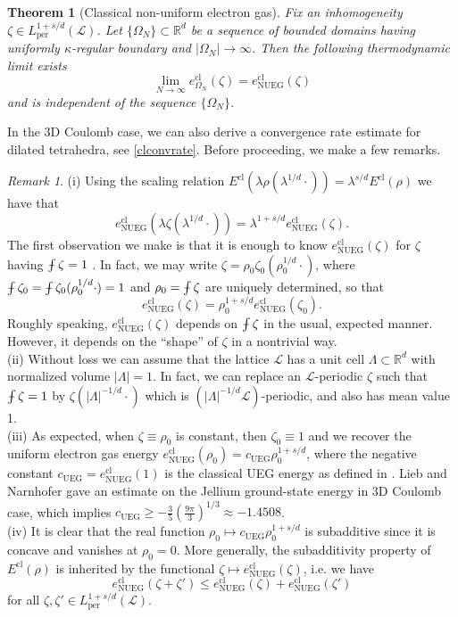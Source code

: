 \documentclass[final,onefignum,onetabnum,reqno]{amsart}
\newtheorem{theorem}{Theorem}[section]
\theoremstyle{remark}
\newtheorem{remark}{Remark}
\renewcommand{\le}{\leqslant}
\renewcommand{\ge}{\geqslant}
\newcommand{\RR}{\mathbb{R}}
\newcommand{\per}{\mathrm{per}} %
\newcommand{\cl}{\mathrm{cl}} %
\newcommand{\UEG}{\mathrm{UEG}} %
\newcommand{\NUEG}{\mathrm{NUEG}} %
\def\Xint#1{\mathchoice
{\XXint\displaystyle\textstyle{#1}}%
{\XXint\textstyle\scriptstyle{#1}}%
{\XXint\scriptstyle\scriptscriptstyle{#1}}%
{\XXint\scriptscriptstyle\scriptscriptstyle{#1}}%
\!\int}
\def\XXint#1#2#3{{\setbox0=\hbox{$#1{#2#3}{\int}$ }
\vcenter{\hbox{$#2#3$ }}\kern-.6\wd0}}
\def\dashint{\Xint-}
\newcommand{\LC}{\mathcal{L}}
\begin{document}
\begin{theorem}[Classical non-uniform electron gas]\label{clnuegthm} 
Fix an inhomogeneity $\zeta\in L_\per^{1+s/d}(\LC)$.
Let $\{\Omega_N\}\subset\RR^d$ be a sequence of bounded domains having uniformly $\kappa$-regular boundary and $|\Omega_N|\to\infty$.
Then the following thermodynamic limit exists
\begin{equation}\label{clnueglim}
\lim_{N\to\infty} e_{\Omega_N}^\cl(\zeta)=e_\NUEG^\cl(\zeta)
\end{equation}
and is independent of the sequence $\{\Omega_N\}$.
\end{theorem}

In the 3D Coulomb case, we can also derive a convergence rate estimate for dilated tetrahedra, see \cref{clconvrate}. Before proceeding, we make a few remarks.

\begin{remark}
\noindent (i) Using the scaling relation $E^\cl(\lambda\rho(\lambda^{1/d}\cdot))=\lambda^{s/d} E^\cl(\rho)$ we have that
$$
e_\NUEG^\cl(\lambda \zeta(\lambda^{1/d}\cdot))=\lambda^{1+s/d} e_\NUEG^\cl(\zeta).
$$
The first observation we make is that it is enough to know $e_\NUEG^\cl(\zeta)$ for $\zeta$ having $\dashint\zeta=1$ . In fact, we may write $\zeta=\rho_0\zeta_0(\rho_0^{1/d}\cdot)$, where $\dashint\zeta_0=\dashint \zeta_0(\rho_0^{1/d}\cdot)=1$ and $\rho_0=\dashint\zeta$ are uniquely determined,
so that
$$
e_\NUEG^\cl(\zeta)=\rho_0^{1+s/d} e_\NUEG^\cl(\zeta_0).
$$
Roughly speaking, $e_\NUEG^\cl(\zeta)$ depends on $\dashint\zeta$ in the usual, expected manner. However, it depends on the ``shape'' of $\zeta$ in a nontrivial way. 
\vspace{.3em}\\
\noindent (ii) Without loss we can assume that the lattice $\LC$ has a unit cell $\Lambda\subset\RR^d$ with normalized volume $|\Lambda|=1$. In fact, we can replace an $\LC$-periodic $\zeta$ such that $\dashint\zeta=1$ by $\zeta(|\Lambda|^{-1/d}\cdot)$ which is $(|\Lambda|^{-1/d}\LC)$-periodic, and also has mean value 1. 
\vspace{.3em}\\
\noindent (iii)
As expected, when $\zeta\equiv \rho_0$ is constant, then $\zeta_0\equiv 1$ and we recover the uniform electron gas energy 
$e_\NUEG^\cl(\rho_0)=c_\UEG\rho_0^{1+s/d}$,
where the negative constant $c_\UEG=e_\NUEG^\cl(1)$ is the classical UEG energy as defined in \cite{lewin2018statistical}. Lieb and Narnhofer \cite{lieb1975thermodynamic} gave an estimate on the Jellium ground-state energy in 3D Coulomb case, which implies
$c_\UEG \ge - \frac{3}{5} \left(\frac{9\pi}{3}\right)^{1/3}\approx -1.4508$.
\vspace{.3em}\\
\noindent (iv)
It is clear that the real function $\rho_0\mapsto c_\UEG\rho_0^{1+s/d}$ is subadditive since it is concave and vanishes at $\rho_0=0$. More generally, the subadditivity property of $E^\cl(\rho)$ is inherited by the functional $\zeta\mapsto e_\NUEG^\cl(\zeta)$, i.e. we have 
$$
e_\NUEG^\cl(\zeta+\zeta')\le e_\NUEG^\cl(\zeta)+e_\NUEG^\cl(\zeta')
$$
for all  $\zeta,\zeta'\in L_\per^{1+s/d}(\LC)$.
\end{remark}
\end{document}
